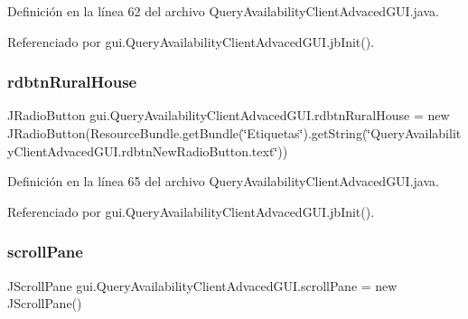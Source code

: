 Definición en la línea 62 del archivo Query\+Availability\+Client\+Advaced\+G\+U\+I.\+java.



Referenciado por gui.\+Query\+Availability\+Client\+Advaced\+G\+U\+I.\+jb\+Init().

\mbox{\label{classgui_1_1_query_availability_client_advaced_g_u_i_a1e9d6054bfe1c1b27a5a8f7fc6adcd81}} 
\subsubsection{\texorpdfstring{rdbtnRuralHouse}{rdbtnRuralHouse}}
{\footnotesize\ttfamily J\+Radio\+Button gui.\+Query\+Availability\+Client\+Advaced\+G\+U\+I.\+rdbtn\+Rural\+House = new J\+Radio\+Button(Resource\+Bundle.\+get\+Bundle(\char`\"{}Etiquetas\char`\"{}).get\+String(\char`\"{}Query\+Availability\+Client\+Advaced\+G\+U\+I.\+rdbtn\+New\+Radio\+Button.\+text\char`\"{}))\hspace{0.3cm}{\ttfamily [private]}}



Definición en la línea 65 del archivo Query\+Availability\+Client\+Advaced\+G\+U\+I.\+java.



Referenciado por gui.\+Query\+Availability\+Client\+Advaced\+G\+U\+I.\+jb\+Init().

\mbox{\label{classgui_1_1_query_availability_client_advaced_g_u_i_aff9fb296abe1a0bfe76a825ad4e75a46}} 
\subsubsection{\texorpdfstring{scrollPane}{scrollPane}}
{\footnotesize\ttfamily J\+Scroll\+Pane gui.\+Query\+Availability\+Client\+Advaced\+G\+U\+I.\+scroll\+Pane = new J\+Scroll\+Pane()\hspace{0.3cm}{\ttfamily [private]}}



